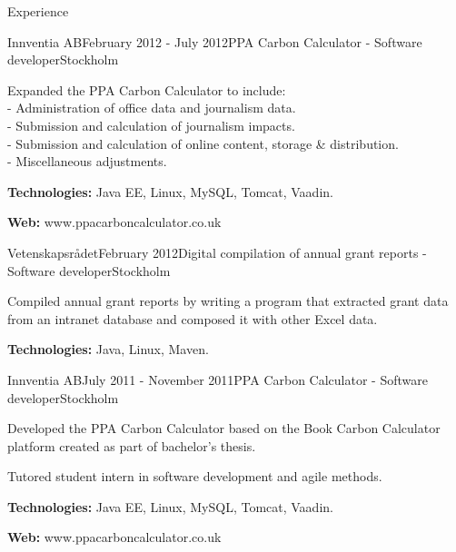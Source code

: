 \documentclass{resume}
\begin{document}
\begin{rSection}{Experience}
    \begin{rSubsection}{Innventia AB}{February 2012 - July 2012}{PPA Carbon Calculator - Software developer}{Stockholm}
      \item Expanded the PPA Carbon Calculator to include:\\
      - Administration of office data and journalism data. \\
      - Submission and calculation of journalism impacts.\\
      - Submission and calculation of online content, storage \& distribution.\\
      - Miscellaneous adjustments.
      \item \textbf{Technologies:}  Java EE, Linux, MySQL, Tomcat, Vaadin.
      \item \textbf{Web:} www.ppacarboncalculator.co.uk
    \end{rSubsection}

    \begin{rSubsection}{Vetenskapsrådet}{February 2012}{Digital compilation of annual grant reports - Software developer}{Stockholm}
      \item Compiled annual grant reports by writing a program that extracted grant data from an intranet database and composed it with other Excel data.
      \item \textbf{Technologies:} Java, Linux, Maven.
    \end{rSubsection}

    \begin{rSubsection}{Innventia AB}{July 2011 - November 2011}{PPA Carbon Calculator - Software developer}{Stockholm}
      \item Developed the PPA Carbon Calculator based on the Book Carbon Calculator platform created as part of bachelor's thesis.
      \item Tutored student intern in software development and agile methods.
      \item \textbf{Technologies:}  Java EE, Linux, MySQL, Tomcat, Vaadin.
      \item \textbf{Web:} www.ppacarboncalculator.co.uk
    \end{rSubsection}
  \end{rSection}
\end{document}
